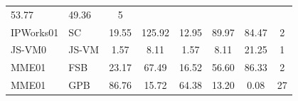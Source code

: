 \documentclass[11pt,a4paper]{article}
\begin{document}
\begin{table}[H]
\begin{tabular}{llcccccc}
    
        53.77
     &

    
        49.36
     &

    
        5
    
    \\

    IPWorks01 &
    SC &

    
        19.55
     &

    
        125.92
     &

    
        12.95
     &

    
        89.97
     &

    
        84.47
     &

    
        2
    
    \\

    JS-VM0 &
    JS-VM &

    
        1.57
     &

    
        8.11
     &

    
        1.57
     &

    
        8.11
     &

    
        21.25
     &

    
        1
    
    \\

    MME01 &
    FSB &

    
        23.17
     &

    
        67.49
     &

    
        16.52
     &

    
        56.60
     &

    
        86.33
     &

    
        2
    
    \\

    MME01 &
    GPB &

    
        86.76
     &

    
        15.72
     &

    
        64.38
     &

    
        13.20
     &

    
        0.08
     &

    
        27
    

\end{tabular}
\end{table}
\end{document}
